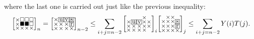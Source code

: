 \documentclass[a4paper,12pt]{article}
\makeatletter
\newcommand{\mybox}[1]{%
  \begingroup
  \setlength{\fboxsep}{1pt}%
  \fbox{\small #1}%
  \endgroup
}
\newenvironment{grid}
  {\begingroup\footnotesize
   \renewcommand{\arraystretch}{0}
   \setlength{\arraycolsep}{0pt}
   \left[\begin{array}{@{}*{10}{c}@{}}}
  {\end{array}\right]\endgroup}
\newcommand{\void}{\phantom{\times}}
\makeatother
\begin{document}
    where the last one is carried out just like the previous inequality:
   	\[
		 \begin{grid}
			\times & \square & \square & \square \\
			\times & \blacksquare & \blacksquare & \square \\
			\times & \times & \times & \times
		    \end{grid}_n = \begin{grid}
			\times & \mybox{u} & \mybox{v} & \mybox{s} \\
			\times & \times & \times & \mybox{r} \\
			\times & \times & \times & \times
		 \end{grid}_{n-2} \le \sum_{i+j=n-2} \begin{grid}
			 \void & \void & \void & \times & \void\\
			 \times & \mybox{u} & \mybox{v} & \times & \times \\
			 \times & \times & \times & \times & \times \\
			 \times & \times & \times & \times & \void
		 \end{grid}_i \begin{grid}
			\void & \times & \times & \void \\
			\times & \times & \times & \mybox{s} \\
			\times & \times & \times & \mybox{r} \\
			\times & \times & \times & \times
		 \end{grid}_j \le \sum_{i+j=n-2} Y(i)T(j).
	\] 
    
\end{document}
